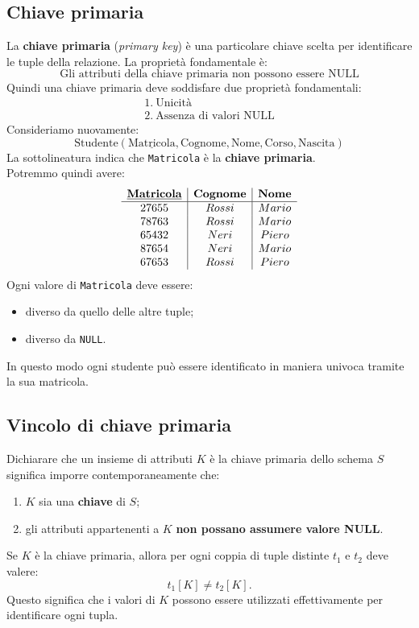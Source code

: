 \subsection{Chiave primaria}
La \textbf{chiave primaria} (\textit{primary key}) è una particolare
chiave scelta per identificare le tuple della relazione.
La proprietà fondamentale è:
\[
\boxed{
\text{Gli attributi della chiave primaria non possono essere NULL}
}
\]
Quindi una chiave primaria deve soddisfare due proprietà fondamentali:
\[
\boxed{
\begin{array}{l}
1.\ \text{Unicità} \\
2.\ \text{Assenza di valori NULL}
\end{array}
}
\]
Consideriamo nuovamente:
\[
\text{Studente}(
\underline{\text{Matricola}},
\text{Cognome},
\text{Nome},
\text{Corso},
\text{Nascita})
\]
La sottolineatura indica che \texttt{Matricola} è la
\textbf{chiave primaria}.\\
Potremmo quindi avere:
\[
\begin{array}{c|c|c}
\textbf{\underline{Matricola}} & \textbf{Cognome} & \textbf{Nome} \\ \hline
27655 & Rossi & Mario \\
78763 & Rossi & Mario \\
65432 & Neri & Piero \\
87654 & Neri & Mario \\
67653 & Rossi & Piero
\end{array}
\]
Ogni valore di \texttt{Matricola} deve essere:
\begin{itemize}
    \item diverso da quello delle altre tuple;
    \item diverso da \texttt{NULL}.
\end{itemize}
\noindent In questo modo ogni studente può essere identificato in maniera
univoca tramite la sua matricola.

\subsection{Vincolo di chiave primaria}
Dichiarare che un insieme di attributi $K$ è la chiave primaria dello
schema $S$ significa imporre contemporaneamente che:
\begin{enumerate}
    \item $K$ sia una \textbf{chiave} di $S$;
    \item gli attributi appartenenti a $K$ \textbf{non possano assumere
    valore NULL}.
\end{enumerate}
\noindent Se $K$ è la chiave primaria, allora per ogni coppia di tuple distinte
$t_1$ e $t_2$ deve valere:
\[
t_1[K] \neq t_2[K].
\]
Questo significa che i valori di $K$ possono essere utilizzati
effettivamente per identificare ogni tupla.
